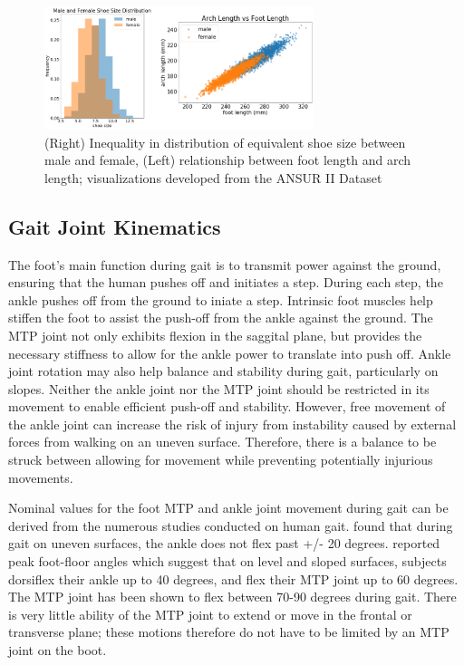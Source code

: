 \documentclass[defaultstyle,11pt]{comps}
\begin{document}
\begin{figure}
\hypertarget{fig:SA3-ANSUR}{%
\centering
\includegraphics[width=0.7\textwidth,height=\textheight]{../fig/SA3/ANSUR.png}
\caption{(Right) Inequality in distribution of equivalent shoe size between male and female, (Left) relationship between foot length and arch length; visualizations developed from the ANSUR II Dataset}\label{fig:SA3-ANSUR}
}
\end{figure}

\hypertarget{gait-joint-kinematics}{%
\subsection{Gait Joint Kinematics}\label{gait-joint-kinematics}}

The foot's main function during gait is to transmit power against the ground, ensuring that the human pushes off and initiates a step.
During each step, the ankle pushes off from the ground to iniate a step.
Intrinsic foot muscles help stiffen the foot to assist the push-off from the ankle against the ground\citep{Farris2019}.
The MTP joint not only exhibits flexion in the saggital plane, but provides the necessary stiffness to allow for the ankle power to translate into push off\citep{Stefanyshyn1997}.
Ankle joint rotation may also help balance and stability during gait, particularly on slopes\citep{Wannop2014}. Neither the ankle joint nor the MTP joint should be restricted in its movement to enable efficient push-off and stability.
However, free movement of the ankle joint can increase the risk of injury from instability caused by external forces from walking on an uneven surface.
Therefore, there is a balance to be struck between allowing for movement while preventing potentially injurious movements.

Nominal values for the foot MTP and ankle joint movement during gait can be derived from the numerous studies conducted on human gait.
\citep{Voloshina2013} found that during gait on uneven surfaces, the ankle does not flex past +/- 20 degrees.
\citep{Wannop2014} reported peak foot-floor angles which suggest that on level and sloped surfaces, subjects dorsiflex their ankle up to 40 degrees, and flex their MTP joint up to 60 degrees.
The MTP joint has been shown to flex between 70-90 degrees during gait\citep{Mann1979}.
There is very little ability of the MTP joint to extend or move in the frontal or transverse plane\citep{Mann1979}; these motions therefore do not have to be limited by an MTP joint on the boot.
\end{document}
